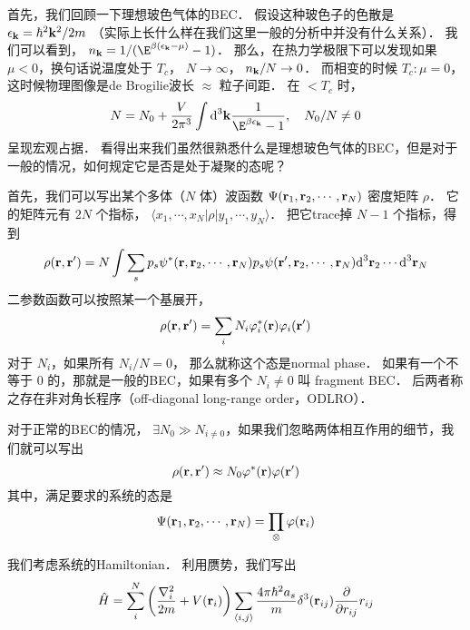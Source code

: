 
首先，我们回顾一下理想玻色气体的BEC． 假设这种玻色子的色散是 $\epsilon_{\bf k} = \hbar^2{\bf k}^2/2m$ （实际上长什么样在我们这里一般的分析中并没有什么关系）． 我们可以看到， $n_{\bf k}=1/(\E^{\beta(\epsilon_{\bf k}-\mu)}-1)$． 那么，在热力学极限下可以发现如果 $\mu<0$，换句话说温度处于 $T_c$， $N\to\infty$， $n_{\bf k}/N\to 0$． 而相变的时候 $T_c: \mu=0$，这时候物理图像是de Brogilie波长 $\approx$ 粒子间距． 在 $<T_c$ 时，
\begin{equation}
N=N_0+\frac{V}{2\pi^3}\int \text{d}^3{\bf k}\frac{1}{\E^{\beta\epsilon_{\bf k}}-1},\quad N_0/N\neq0
\end{equation}
呈现宏观占据． 看得出来我们虽然很熟悉什么是理想玻色气体的BEC，但是对于一般的情况，如何规定它是否是处于凝聚的态呢？

首先，我们可以写出某个多体（$N$ 体）波函数 $\Psi({\bf r}_1,{\bf r}_2,\cdots,{\bf r}_N)$ 密度矩阵 $\rho$． 它的矩阵元有 $2N$ 个指标， $\langle x_1,\cdots,x_N|\rho|y_1,\cdots,y_N\rangle$． 把它trace掉 $N-1$ 个指标，得到
\begin{equation}
\rho({\bf r},{\bf r'}) = N\int\sum_s p_s\psi^*({\bf r},{\bf r}_2,\cdots,{\bf r}_N)p_s\psi({\bf r'},{\bf r}_2,\cdots,{\bf r}_N)\text{d}^3{\bf r}_2\cdots\text{d}^3{\bf r}_N
\end{equation}
二参数函数可以按照某一个基展开，
\begin{equation}
\rho({\bf r},{\bf r'}) = \sum_i N_i \varphi_i^*({\bf r})\varphi_i({\bf r'})
\end{equation}
对于 $N_i$，如果所有 $N_i/N=0$， 那么就称这个态是normal phase． 如果有一个不等于 $0$ 的，那就是一般的BEC，如果有多个 $N_i\neq0$ 叫 fragment BEC． 后两者称之存在非对角长程序（off-diagonal long-range order，ODLRO）．

对于正常的BEC的情况， $\exists N_0\gg N_{i\neq0}$，如果我们忽略两体相互作用的细节，我们就可以写出
\begin{equation}
\rho({\bf r,r'}) \approx N_0\varphi^*({\bf r})\varphi({\bf r'})
\end{equation}
其中，满足要求的系统的态是
\begin{equation}\label{BECSup_eq5}
\Psi({\bf r}_1,{\bf r}_2,\cdots,{\bf r}_N) = \prod_{\otimes}\varphi({\bf r}_i)
\end{equation}

我们考虑系统的Hamiltonian． 利用赝势，我们写出
\begin{equation}
\hat{H} = \sum_i^N \left(\frac{\nabla_i^2}{2m}+V({\bf r}_i)\right)\sum_{\langle i,j\rangle}\frac{4\pi\hbar^2 a_s}{m}\delta^3({\bf r}_{ij})\frac{\partial}{\partial r_{ij}}r_{ij}
\end{equation}

